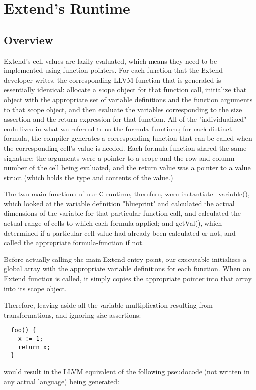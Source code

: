 \chapter{Extend's Runtime}

\section{Overview}
Extend's cell values are lazily evaluated, which means they need to be implemented using function pointers. For each function that the Extend developer writes, the corresponding LLVM function that is generated is essentially identical: allocate a scope object for that function call, initialize that object with the appropriate set of variable definitions and the function arguments to that scope object, and then evaluate the variables corresponding to the size assertion and the return expression for that function. All of the "individualized" code lives in what we referred to as the formula-functions; for each distinct formula, the compiler generates a corresponding function that can be called when the corresponding cell's value is needed. Each formula-function shared the same signature: the arguments were a pointer to a scope and the row and column number of the cell being evaluated, and the return value was a pointer to a value struct (which holds the type and contents of the value.)

The two main functions of our C runtime, therefore, were instantiate\_variable(), which looked at the variable definition "blueprint" and calculated the actual dimensions of the variable for that particular function call, and calculated the actual range of cells to which each formula applied; and getVal(), which determined if a particular cell value had already been calculated or not, and called the appropriate formula-function if not.

Before actually calling the main Extend entry point, our executable initializes a global array with the appropriate variable definitions for each function. When an Extend function is called, it simply copies the appropriate pointer into that array into its scope object.

Therefore, leaving aside all the variable multiplication resulting from transformations, and ignoring size assertions:
\begin{lstlisting}
  foo() {
    x := 1;
    return x;
  }
\end{lstlisting}
\medskip \noindent
would result in the LLVM equivalent of the following pseudocode (not written in any actual language) being generated:

